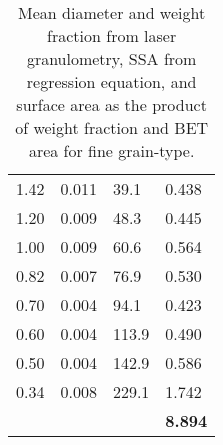 \begin{table}[h!]
\begin{tabularx}{\linewidth}{|X|X|X|X|}
     1.42 & 0.011 & 39.1 & 0.438 \\
     1.20 & 0.009 & 48.3 & 0.445 \\
     1.00 & 0.009 & 60.6 & 0.564 \\
     0.82 & 0.007 & 76.9 & 0.530 \\
     0.70 & 0.004 & 94.1 & 0.423 \\
     0.60 & 0.004 & 113.9 & 0.490 \\
     0.50 & 0.004 & 142.9 & 0.586 \\
     0.34 & 0.008 & 229.1 & 1.742 \\
       &   &   & \textbf{8.894} \\
       \bottomrule
     \end{tabularx}
     \vfill
   
    \caption{Mean diameter and weight fraction from laser granulometry, SSA from regression equation, and surface area as the product of weight fraction and BET area for fine grain-type.}
    \label{tab:app_bet_laser_fine}
 \end{table}

